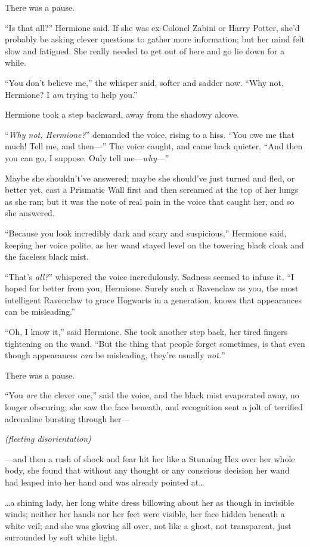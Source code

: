 There was a pause.

“Is that all?” Hermione said. If she was ex-Colonel Zabini or Harry Potter,
she’d probably be asking clever questions to gather more information; but her
mind felt slow and fatigued. She really needed to get out of here and go lie
down for a while.

“You don’t believe me,” the whisper said, softer and sadder now. “Why not,
Hermione? I \emph{am} trying to help you.”

Hermione took a step backward, away from the shadowy alcove.

“\emph{Why not, Hermione?}” demanded the voice, rising to a hiss. “You owe me
that much! Tell me, and then—” The voice caught, and came back quieter. “And
then you can go, I suppose. Only tell me—\emph{why}—”

Maybe she shouldn’t’ve answered; maybe she should’ve just turned and fled, or
better yet, cast a Prismatic Wall first and then screamed at the top of her
lungs as she ran; but it was the note of real pain in the voice that caught
her, and so she answered.

“Because you look incredibly dark and scary and suspicious,” Hermione said,
keeping her voice polite, as her wand stayed level on the towering black cloak
and the faceless black mist.

“That’s \emph{all?}” whispered the voice incredulously. Sadness seemed to
infuse it. “I hoped for better from you, Hermione. Surely such a Ravenclaw as
you, the most intelligent Ravenclaw to grace Hogwarts in a generation, knows
that appearances can be misleading.”

“Oh, I know it,” said Hermione. She took another step back, her tired fingers
tightening on the wand. “But the thing that people forget sometimes, is that
even though appearances \emph{can} be misleading, they’re usually \emph{not.}”

There was a pause.

“You \emph{are} the clever one,” said the voice, and the black mist evaporated
away, no longer obscuring; she saw the face beneath, and recognition sent a
jolt of terrified adrenaline bursting through her—

\emph{(fleeting disorientation)}

—and then a rush of shock and fear hit her like a Stunning Hex over her whole
body, she found that without any thought or any conscious decision her wand had
leaped into her hand and was already pointed at…

…a shining lady, her long white dress billowing about her as though in
invisible winds; neither her hands nor her feet were visible, her face hidden
beneath a white veil; and she was glowing all over, not like a ghost, not
transparent, just surrounded by soft white light.

